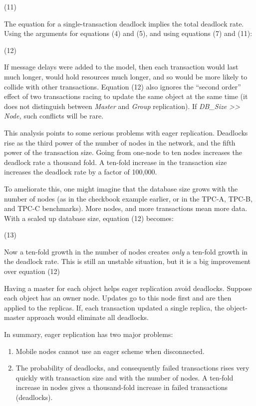 \documentclass[a4paper,11pt,twoside,openright]{article}
\begin{document}
(11)

The equation for a single-transaction deadlock implies the total
deadlock rate. Using the arguments for equations (4) and (5), and using
equations (7) and (11):

(12)

If message delays were added to the model, then each transaction would
last much longer, would hold resources much longer, and so would be more
likely to collide with other transactions. Equation (12) also ignores
the ``second order'' effect of two transactions racing to update the
same object at the same time (it does not distinguish between
\emph{Master} and \emph{Group} replication). If \emph{DB\_Size
\textgreater{}\textgreater{} Node,} such conflicts will be rare.

This analysis points to some serious problems with eager replication.
Deadlocks rise as the third power of the number of nodes in the network,
and the fifth power of the transaction size. Going from one-node to ten
nodes increases the deadlock rate a thousand fold. A ten-fold increase
in the transaction size increases the deadlock rate by a factor of
100,000.

To ameliorate this, one might imagine that the database size grows with
the number of nodes (as in the checkbook example earlier, or in the
TPC-A, TPC-B, and TPC-C benchmarks). More nodes, and more transactions
mean more data. With a scaled up database size, equation (12) becomes:

(13)

Now a ten-fold growth in the number of nodes creates \emph{only} a
ten-fold growth in the deadlock rate. This is still an unstable
situation, but it is a big improvement over equation (12)

Having a master for each object helps eager replication avoid deadlocks.
Suppose each object has an owner node. Updates go to this node first and
are then applied to the replicas. If, each transaction updated a single
replica, the object-master approach would eliminate all deadlocks.

In summary, eager replication has two major problems:

\begin{enumerate}
\def\labelenumi{\arabic{enumi}.}
\item
  Mobile nodes cannot use an eager scheme when disconnected.
\item
  The probability of deadlocks, and consequently failed transactions
  rises very quickly with transaction size and with the number of nodes.
  A ten-fold increase in nodes gives a thousand-fold increase in failed
  transactions (deadlocks).
\end{enumerate}
\end{document}
